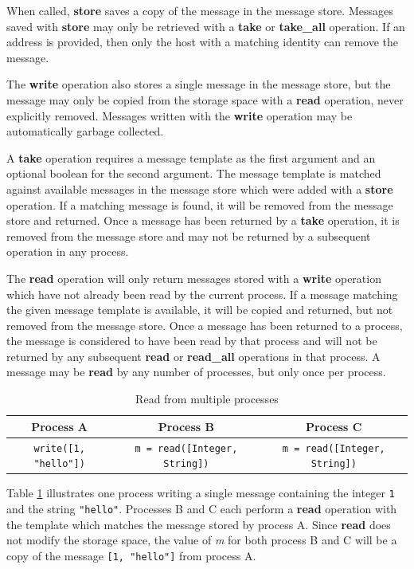 \documentclass{llncs}
\begin{document}
When called, \textbf{store} saves a copy of the message in the message store. Messages saved with \textbf{store} may only be retrieved with a \textbf{take} or \textbf{take\_all} operation. If an address is provided, then only the host with a matching identity can remove the message.

The \textbf{write} operation also stores a single message in the message store, but the message may only be copied from the storage space with a \textbf{read} operation, never explicitly removed. Messages written with the \textbf{write} operation may be automatically garbage collected.

A \textbf{take} operation requires a message template as the first argument and an optional boolean for the second argument. The message template is matched against available messages in the message store which were added with a \textbf{store} operation. If a matching message is found, it will be removed from the message store and returned. Once a message has been returned by a \textbf{take} operation, it is removed from the message store and may not be returned by a subsequent operation in any process.

The \textbf{read} operation will only return messages stored with a \textbf{write} operation which have not already been read by the current process. If a message matching the given message template is available, it will be copied and returned, but not removed from the message store. Once a message has been returned to a process, the message is considered to have been read by that process and will not be returned by any subsequent \textbf{read} or \textbf{read\_all} operations in that process. A message may be \textbf{read} by any number of processes, but only once per process.

\begin{table}
\centering
\caption{Read from multiple processes}
\begin{tabular}{|c|c|c|} \hline
\textbf{Process A} & \textbf{Process B} & \textbf{Process C} \\ \hline
\texttt{write([1, "hello"])} & \texttt{m = read([Integer, String])} & \texttt{m = read([Integer, String])} \\ \hline
\end{tabular}
\label{fig:readprocesses}
\end{table}

Table \ref{fig:readprocesses} illustrates one process writing a single message containing the integer \texttt{1} and the string \texttt{"hello"}. Processes B and C each perform a \textbf{read} operation with the template which matches the message stored by process A. Since \textbf{read} does not modify the storage space, the value of \textit{m} for both process B and C will be a copy of the message \texttt{[1, "hello"]} from process A.
\end{document}
